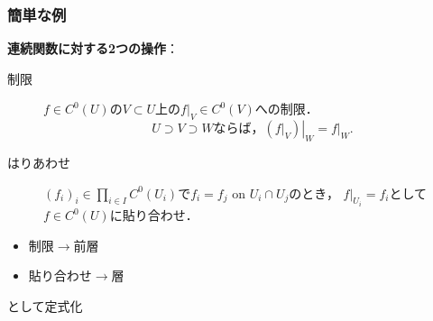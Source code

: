 \documentclass[dvipdfmx,10pt,aspectratio=169,leqno]{beamer}%
\numberwithin{equation}{subsection}
\theoremstyle{mystyle}
\begin{document}
\begin{frame}
    \frametitle{簡単な例}

    \textbf{連続関数に対する2つの操作}：
    \begin{description}
        \item[制限]\(f\in C^0(U)\)の\(V\subset U\)上の\(f\rvert_V\in C^0(V)\)への制限．
        \[
            \text{\(U\supset V\supset W\)ならば，}
            \left.({f\rvert_V})\right\rvert_W=f\rvert_W.
        \]
        \item[はりあわせ]
        \((f_i)_{i}\in\prod_{i\in I}^{}C^{0}(U_i)\)で\(f_i=f_j\) on \(U_i\cap U_j\)のとき，
        \(f\rvert_{U_i}=f_i\)として\(f\in C^{0}(U)\)に貼り合わせ．
    \end{description}

    \bigskip
    \begin{itemize}
        \item 制限\(\to\)前層
        \item 貼り合わせ\(\to\)層
    \end{itemize}
    として定式化
\end{frame}
\end{document}
